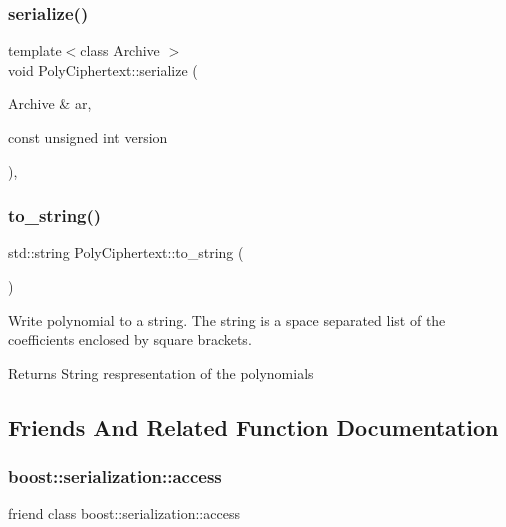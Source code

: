 \subsubsection{\texorpdfstring{serialize()}{serialize()}}
{\footnotesize\ttfamily template$<$class Archive $>$ \\
void Poly\+Ciphertext\+::serialize (\begin{DoxyParamCaption}\item[{Archive \&}]{ar,  }\item[{const unsigned int}]{version }\end{DoxyParamCaption})\hspace{0.3cm}{\ttfamily [inline]}, {\ttfamily [private]}}

\mbox{\label{classPolyCiphertext_a4ffc33808a07305df76a26a0fdc60d8e}} 
\subsubsection{\texorpdfstring{to\+\_\+string()}{to\_string()}}
{\footnotesize\ttfamily std\+::string Poly\+Ciphertext\+::to\+\_\+string (\begin{DoxyParamCaption}{ }\end{DoxyParamCaption})}

Write polynomial to a string. The string is a space separated list of the coefficients enclosed by square brackets. \begin{DoxyReturn}{Returns}
String respresentation of the polynomials 
\end{DoxyReturn}


\subsection{Friends And Related Function Documentation}
\mbox{\label{classPolyCiphertext_ac98d07dd8f7b70e16ccb9a01abf56b9c}} 
\subsubsection{\texorpdfstring{boost\+::serialization\+::access}{boost::serialization::access}}
{\footnotesize\ttfamily friend class boost\+::serialization\+::access\hspace{0.3cm}{\ttfamily [friend]}}

